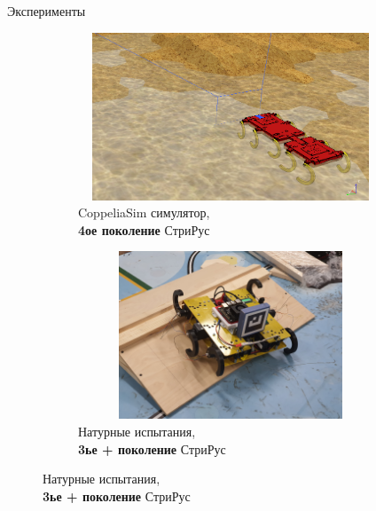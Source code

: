\documentclass[aspectratio=169,xcolor=table,10pt]{beamer}
\begin{document}
\begin{frame}[t]{Эксперименты}
    \begin{figure}[H]
        \begin{subfigure}[t]{0.49\textwidth}
            \centering\includegraphics[height=5cm,width=1\textwidth,keepaspectratio]{coppelia_sim.png}
            \caption*{CoppeliaSim симулятор,\\ \textbf{4ое поколение} СтриРус}
        \end{subfigure}
        \begin{subfigure}[t]{0.49\textwidth}
            \centering\includegraphics[height=5cm,width=1\textwidth,keepaspectratio]{rl_sim.JPG}
            \caption*{Натурные испытания,\\ \textbf{3ье + поколение} СтриРус}
        \end{subfigure}
    \end{figure}
\end{frame}
\end{document}
